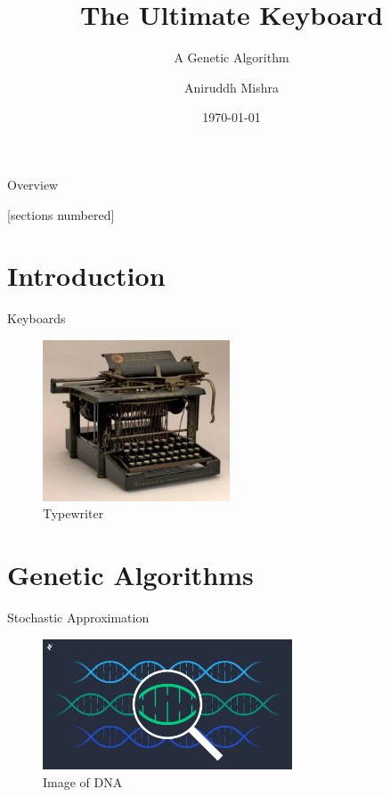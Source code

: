 \documentclass{beamer}
\title{The Ultimate Keyboard}
\subtitle{A Genetic Algorithm}
\author{Aniruddh Mishra}
\institute{Institute for Computing in Research}
\date{\today}
\begin{document}
    \begin{frame}
        \maketitle
    \end{frame}

    \begin{frame}{Overview}
        \vspace{-5em}
        \begin{adjustwidth}{3em}{-1em}
            [sections numbered]
            \begin{multicols}{2}
                \setlength{\parskip}{2em}
                \tableofcontents
            \end{multicols}
        \end{adjustwidth}
    \end{frame}
    
    \section{Introduction}

    \begin{frame}{Keyboards}
        \begin{figure}
            \centering
            \includegraphics[width=15em, keepaspectratio]{images/typewriter.png}
            \caption{Typewriter \cite{typewriter}}
        \end{figure}
    \end{frame}

    \section{Genetic Algorithms}

    \begin{frame}{Stochastic Approximation}
        \begin{figure}
            \centering
            \includegraphics[width=20em, keepaspectratio]{images/genetic.png}
            \caption{Image of DNA \cite{genetic}}
        \end{figure}
    \end{frame}
\end{document}
